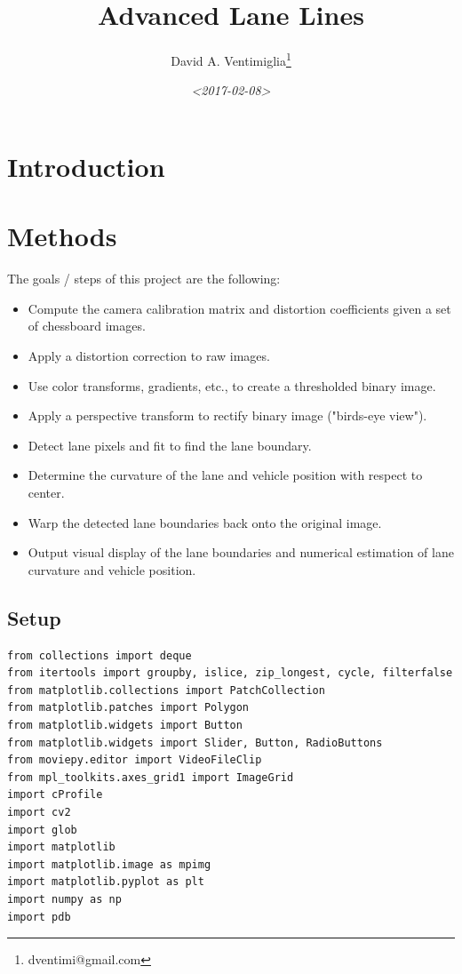 \documentclass[11pt]{article}
\author{David A. Ventimiglia\thanks{dventimi@gmail.com}}
\date{\textit{<2017-02-08>}}
\title{Advanced Lane Lines}
\begin{document}
\maketitle


\section*{Introduction}
\label{sec-1}

\section*{Methods}
\label{sec-2}

The goals / steps of this project are the following:

\begin{itemize}
\item Compute the camera calibration matrix and distortion coefficients
given a set of chessboard images.
\item Apply a distortion correction to raw images.
\item Use color transforms, gradients, etc., to create a thresholded
binary image.
\item Apply a perspective transform to rectify binary image ("birds-eye
view").
\item Detect lane pixels and fit to find the lane boundary.
\item Determine the curvature of the lane and vehicle position with
respect to center.
\item Warp the detected lane boundaries back onto the original image.
\item Output visual display of the lane boundaries and numerical
estimation of lane curvature and vehicle position.
\end{itemize}

\subsection*{Setup}
\label{sec-2-1}

\begin{verbatim}
from collections import deque
from itertools import groupby, islice, zip_longest, cycle, filterfalse
from matplotlib.collections import PatchCollection
from matplotlib.patches import Polygon
from matplotlib.widgets import Button
from matplotlib.widgets import Slider, Button, RadioButtons
from moviepy.editor import VideoFileClip
from mpl_toolkits.axes_grid1 import ImageGrid
import cProfile
import cv2
import glob
import matplotlib
import matplotlib.image as mpimg
import matplotlib.pyplot as plt
import numpy as np
import pdb
\end{verbatim}
\end{document}
